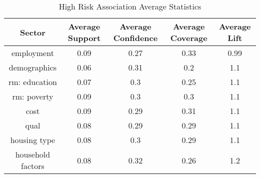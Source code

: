 \begin{table}[h]
    \centering
    \caption{High Risk Association Average Statistics}
    \label{tab:high_risk_ass} %
    \begin{tabular}{|c|c|c|c|c|}
    \hline
    Sector & Average Support & Average Confidence & Average Coverage & Average Lift \\
    \hline
    employment & 0.09 & 0.27 & 0.33 & 0.99 \\
    demographics & 0.06 & 0.31 & 0.2 & 1.1 \\
    rm: education & 0.07 & 0.3 & 0.25 & 1.1 \\
    rm: poverty & 0.09 & 0.3 & 0.3 & 1.1 \\
    cost & 0.09 & 0.29 & 0.31 & 1.1 \\
    qual & 0.08 & 0.29 & 0.29 & 1.1 \\
    housing type & 0.08 & 0.3 & 0.29 & 1.1 \\
    household factors & 0.08 & 0.32 & 0.26 & 1.2 \\
    \hline
    \end{tabular}
\end{table}